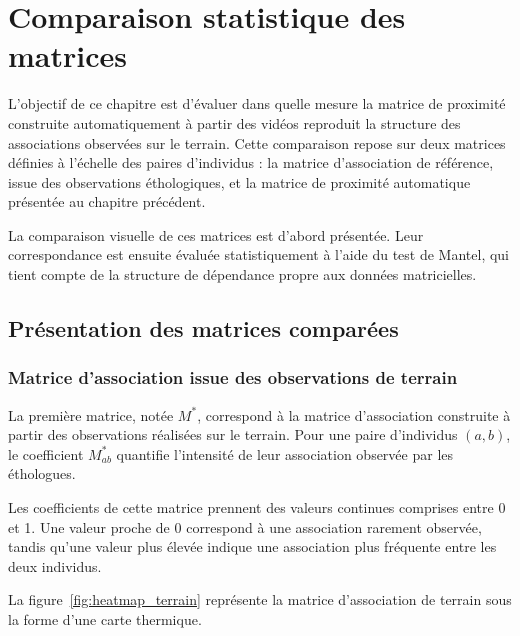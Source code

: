 \documentclass[11pt,a4paper]{report}
\begin{document}

\chapter{Comparaison statistique des matrices}
\label{chap:comparaison}

L'objectif de ce chapitre est d'évaluer dans quelle mesure la matrice de
proximité construite automatiquement à partir des vidéos reproduit la
structure des associations observées sur le terrain. Cette comparaison
repose sur deux matrices définies à l'échelle des paires d'individus :
la matrice d'association de référence, issue des observations
éthologiques, et la matrice de proximité automatique présentée au
chapitre précédent.

La comparaison visuelle de ces matrices est d'abord présentée. Leur
correspondance est ensuite évaluée statistiquement à l'aide du test de
Mantel, qui tient compte de la structure de dépendance propre aux données
matricielles.


\section{Présentation des matrices comparées}
\label{sec:matrices_comparees}

\subsection{Matrice d'association issue des observations de terrain}

La première matrice, notée $M^*$, correspond à la matrice d'association
construite à partir des observations réalisées sur le terrain. Pour une
paire d'individus $(a,b)$, le coefficient $M^*_{ab}$ quantifie
l'intensité de leur association observée par les éthologues.

Les coefficients de cette matrice prennent des valeurs continues
comprises entre 0 et 1. Une valeur proche de 0 correspond à une
association rarement observée, tandis qu'une valeur plus élevée indique
une association plus fréquente entre les deux individus.

La figure~\ref{fig:heatmap_terrain} représente la matrice d'association
de terrain sous la forme d'une carte thermique.
\end{document}
